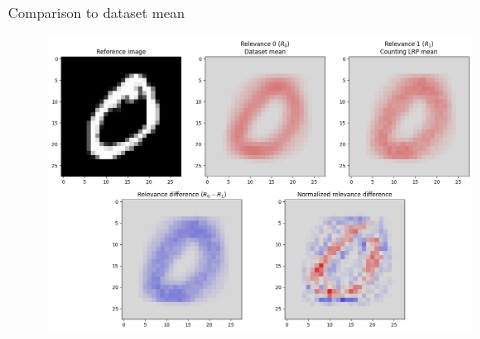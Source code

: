 \documentclass[aspectratio=169]{beamer}
\theoremstyle{definition}
\begin{document}

\begin{frame}{Comparison to dataset mean}
    \begin{figure}
        \includegraphics[width=.7\textwidth]{dataset-relevance-cmp.png}
    \end{figure}
\end{frame}
\end{document}
